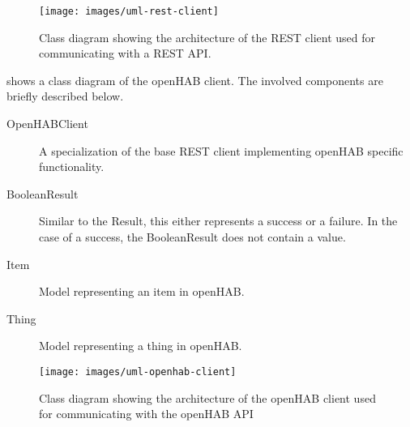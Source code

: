\begin{figure}[h!]
\centering
\texttt{[image: images/uml-rest-client]}
\caption{Class diagram showing the architecture of the REST client used for communicating with a REST API.}
\label{fig:design:communication-with-openhab:class-diagram-rest-client}
\end{figure}

 shows a class diagram of the openHAB client. The involved components are briefly described below.

\begin{description}
\item[OpenHABClient] A specialization of the base REST client implementing openHAB specific functionality.
\item[BooleanResult] Similar to the Result, this either represents a success or a failure. In the case of a success, the BooleanResult does not contain a value.
\item[Item] Model representing an item in openHAB.
\item[Thing] Model representing a thing in openHAB.
\end{description}

\begin{figure}[h!]
\centering
\texttt{[image: images/uml-openhab-client]}
\caption{Class diagram showing the architecture of the openHAB client used for communicating with the openHAB API}
\label{fig:design:communication-with-openhab:class-diagram-openhab-client}
\end{figure}

